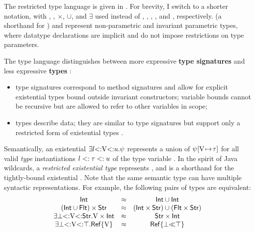 The restricted type language is given in .
For brevity, I switch to a shorter notation, with \tyany, \tybot, 
$\times$, $\cup$, and $\exists$ used instead of
, , , , and ,
respectively. \iname (a shorthand for \tyinv\iname{}) and 
\tyinv\iname{\ldots} represent
non-parametric and invariant parametric types, where datatype
declarations are implicit and do not impose restrictions on type parameters.

The type language distinguishes between more expressive
\textbf{type signatures} \tysig
and less expressive \textbf{types} \ty:
\begin{itemize}
    \item type signatures \tysig correspond to method signatures
      and allow for explicit existential types bound outside
      invariant constructors; variable bounds cannot be recursive but are
      allowed to refer to other variables in scope;
    \item types \ty describe data; they are similar to type signatures
      but support only a restricted form of existential types
      \tyinv\iname\rexvars.
\end{itemize}
Semantically, an existential $\exists l{\operatorname{<:}}\mathrm{V}{\operatorname{<:}}u.\psi$ 
represents a union of $\psi[\mathrm{V}\!\mapsto\!\tau]$ for all valid
\emph{type} instantiations $l <: \tau <: u$ of the type variable \vany.
In the spirit of Java wildcards, a \emph{restricted existential type} 
\tyinv{} %
represents
,
and \tyinv{} is a shorthand for the tightly-bound existential
\tyinv{}.
Note that the same semantic type can have multiple syntactic representations.
For example, the following pairs of types are equivalent:
\[
\begin{array}{ccc}
    \mathsf{Int} &\approx& 
        \mathsf{Int} \cup \mathsf{Int} \\
    (\mathsf{Int} \cup \mathsf{Flt}) \times \mathsf{Str} &\approx&
        (\mathsf{Int} \times \mathsf{Str}) \cup (\mathsf{Flt} \times \mathsf{Str}) \\
    \exists\bot{\operatorname{<:}}\mathrm{V}{\operatorname{<:}}\mathsf{Str}.\mathrm{V} \times \mathsf{Int} &\approx& 
        \mathsf{Str} \times \mathsf{Int} \\
    \exists\bot{\operatorname{<:}}\mathrm{V}{\operatorname{<:}}\top.\mathsf{Ref}\{\mathrm{V}\} &\approx&
        \mathsf{Ref}\{\bot{\operatorname{\ll}}\top\} \\
\end{array}
\]

